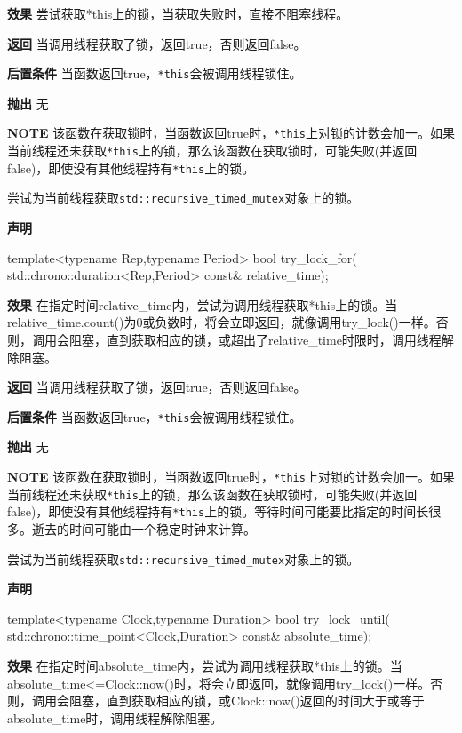 \textbf{效果}
尝试获取*this上的锁，当获取失败时，直接不阻塞线程。

\textbf{返回}
当调用线程获取了锁，返回true，否则返回false。

\textbf{后置条件}
当函数返回true，\texttt{*this}会被调用线程锁住。

\textbf{抛出}
无

\textbf{NOTE} 该函数在获取锁时，当函数返回true时，\texttt{*this}上对锁的计数会加一。如果当前线程还未获取\texttt{*this}上的锁，那么该函数在获取锁时，可能失败(并返回false)，即使没有其他线程持有\texttt{*this}上的锁。


尝试为当前线程获取\texttt{std::recursive\_timed\_mutex}对象上的锁。

\textbf{声明}

\begin{cpp}
template<typename Rep,typename Period>
bool try_lock_for(
    std::chrono::duration<Rep,Period> const& relative_time);
\end{cpp}

\textbf{效果}
在指定时间relative\_time内，尝试为调用线程获取*this上的锁。当relative\_time.count()为0或负数时，将会立即返回，就像调用try\_lock()一样。否则，调用会阻塞，直到获取相应的锁，或超出了relative\_time时限时，调用线程解除阻塞。

\textbf{返回}
当调用线程获取了锁，返回true，否则返回false。

\textbf{后置条件}
当函数返回true，\texttt{*this}会被调用线程锁住。

\textbf{抛出}
无

\textbf{NOTE} 该函数在获取锁时，当函数返回true时，\texttt{*this}上对锁的计数会加一。如果当前线程还未获取\texttt{*this}上的锁，那么该函数在获取锁时，可能失败(并返回false)，即使没有其他线程持有\texttt{*this}上的锁。等待时间可能要比指定的时间长很多。逝去的时间可能由一个稳定时钟来计算。


尝试为当前线程获取\texttt{std::recursive\_timed\_mutex}对象上的锁。

\textbf{声明}

\begin{cpp}
template<typename Clock,typename Duration>
bool try_lock_until(
    std::chrono::time_point<Clock,Duration> const& absolute_time);
\end{cpp}

\textbf{效果}
在指定时间absolute\_time内，尝试为调用线程获取*this上的锁。当absolute\_time<=Clock::now()时，将会立即返回，就像调用try\_lock()一样。否则，调用会阻塞，直到获取相应的锁，或Clock::now()返回的时间大于或等于absolute\_time时，调用线程解除阻塞。

